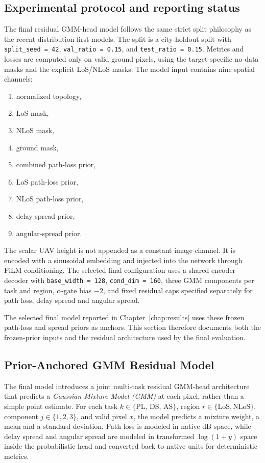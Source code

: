 \subsection{Experimental protocol and reporting status}

The final residual GMM-head model follows the same strict split philosophy as the recent
distribution-first models. The split is a city-holdout split with
\texttt{split\_seed = 42}, \texttt{val\_ratio = 0.15}, and
\texttt{test\_ratio = 0.15}. Metrics and losses are computed only on valid
ground pixels, using the target-specific no-data masks and the explicit
LoS/NLoS masks. The model input contains nine spatial channels:

\begin{enumerate}
\item normalized topology,
\item LoS mask,
\item NLoS mask,
\item ground mask,
\item combined path-loss prior,
\item LoS path-loss prior,
\item NLoS path-loss prior,
\item delay-spread prior,
\item angular-spread prior.
\end{enumerate}

The scalar UAV height is not appended as a constant image channel. It is
encoded with a sinusoidal embedding and injected into the network through FiLM
conditioning. The selected final configuration uses a shared encoder-decoder with
\texttt{base\_width = 128}, \texttt{cond\_dim = 160}, three GMM
components per task and region, \(\alpha\)-gate bias \(-2\), and fixed
residual caps specified separately for path loss, delay spread and
angular spread.

The selected final model reported in Chapter~\ref{chap:results}
uses these frozen path-loss and spread priors as anchors. This
section therefore documents both the frozen-prior inputs and the residual
architecture used by the final evaluation.

\subsection{Prior-Anchored GMM Residual Model}

The final model introduces a joint multi-task residual GMM-head architecture that
predicts a \emph{Gaussian Mixture Model (GMM)} at each pixel, rather than a
simple point estimate. For each task \(k \in \{\mathrm{PL},\, \mathrm{DS},\, \mathrm{AS}\}\),
region \(r\in\{\mathrm{LoS},\mathrm{NLoS}\}\), component
\(j\in\{1,2,3\}\), and valid pixel \(x\), the model predicts a mixture
weight, a mean and a standard deviation. Path loss is modeled in native dB
space, while delay spread and angular spread are modeled in transformed
\(\log(1+y)\) space inside the probabilistic head and converted back to
native units for deterministic metrics.

